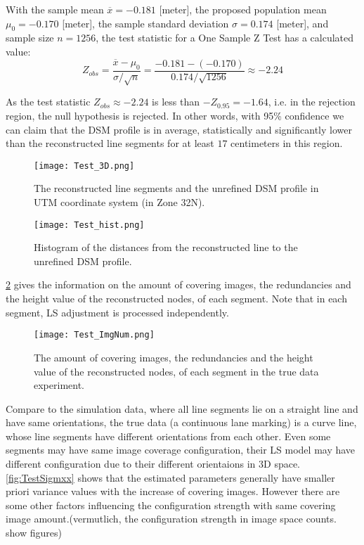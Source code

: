 With the sample mean $\overline{x}=-0.181$ [meter],
the proposed population mean $\mu_0=-0.170$ [meter],
the sample standard deviation $\sigma=0.174$ [meter],
and sample size $n=1256$, the test statistic for a One Sample Z Test has a calculated value:
\begin{equation*}
Z_{obs} = \frac{\overline{x}-\mu_0}{\sigma/\sqrt{n}}=\frac{-0.181-(-0.170)}{0.174/\sqrt{1256}}\approx-2.24
\end{equation*}

As the test statistic $Z_{obs}\approx-2.24$ is less than $-Z_{0.95}=-1.64$, i.e. in the rejection region, the null hypothesis is rejected. In other words, {with 95\% confidence we can claim that the DSM profile is in average, statistically and significantly lower than the reconstructed line segments for at least $17$ centimeters in this region}. %

\begin{figure}
  \centering
  \texttt{[image: Test\_3D.png]}
  \caption{\small The reconstructed line segments and the unrefined DSM profile in UTM coordinate system (in Zone 32N).}
  \label{fig:Test3D}
  \vspace{1cm}
  \texttt{[image: Test\_hist.png]}
  \caption{\small Histogram of the distances from the reconstructed line to the unrefined DSM profile.}
  \label{fig:TestHist}
\end{figure}

\clearpage

\cref{fig:TestImgNum} gives the information on the amount of covering images, the redundancies and the height value of the reconstructed nodes, of each segment. Note that in each segment, LS adjustment is processed independently.

\begin{figure}
  \centering
  \texttt{[image: Test\_ImgNum.png]}
  \caption{\small The amount of covering images, the redundancies and the height value of the reconstructed nodes, of each segment in the true data experiment.}
  \label{fig:TestImgNum}
\end{figure}




Compare to the simulation data, where all line segments lie on a straight line and have same orientations, the true data (a continuous lane marking) is a curve line, whose line segments have different orientations from each other. Even some segments may have same image coverage configuration, their LS model may have different configuration due to their different orientaions in 3D space. \cref{fig:TestSigmxx} shows that the estimated parameters generally have smaller priori variance values with the increase of covering images. However there are some other factors influencing the configuration strength with same covering image amount.(vermutlich, the configuration strength in image space counts. show figures)

